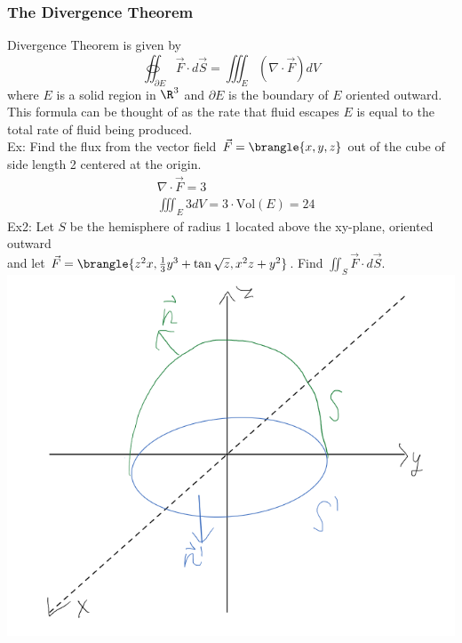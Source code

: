 \subsubsection{The Divergence Theorem}
Divergence Theorem is given by
$$\oiint_{\partial E}\vec{F}\cdot d\vec{S}=\iiint_E(\nabla\cdot \vec{F})dV$$
where $E$ is a solid region in $\R^3$ and $\partial E$ is the boundary of $E$ oriented outward.\\
This formula can be thought of as the rate that fluid escapes $E$ is equal to the total rate of fluid being produced.\\
Ex: Find the flux from the vector field $\vec{F}=\brangle{x,y,z}$ out of the cube of side length 2 centered at the origin.
\begin{align*}
    &\nabla\cdot \vec{F}=3\\
    &\iiint_E 3dV=3\cdot\text{Vol}(E)=24
\end{align*}
Ex2: Let $S$ be the hemisphere of radius 1 located above the xy-plane, oriented outward\\
and let $\vec{F}=\brangle{z^2x,\frac{1}{3}y^3+\tan\sqrt{z},x^2z+y^2}$. Find $\iint_S\vec{F}\cdot d\vec{S}$.\\
\includegraphics[scale=0.5]{Images/Math217Pictures/divergenceThmEx.png}
